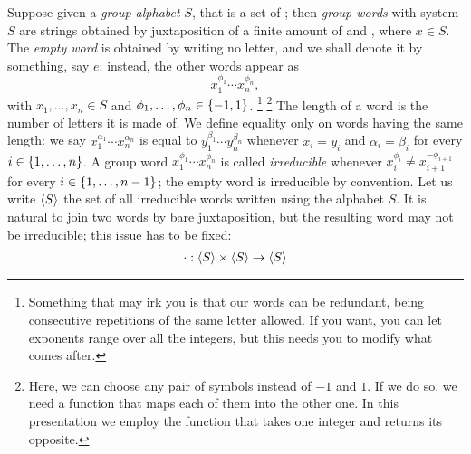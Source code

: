 \begin{example}
Suppose given a {\em group alphabet} \(S\), that is a set of ; then {\em group words} with system \(S\) are strings obtained by juxtaposition of a finite amount of  and , where \(x \in S\). The {\em empty word} is obtained by writing no letter, and we shall denote it by something, say \(e\); instead, the other words appear as
\[x_1^{\phi_1} \cdots{} x_n^{\phi_n},\]
with \(x_1, \dots{}, x_n \in S\) and \(\phi_1, \dots{}, \phi_n \in \left\{-1, 1\right\}\).
\footnote{Something that may irk you is that our words can be redundant, being consecutive repetitions of the same letter allowed. If you want, you can let exponents range over all the integers, but this needs you to modify what comes after.}
\footnote{Here, we can choose any pair of symbols instead of \(-1\) and \(1\). If we do so, we need a function that maps each of them into the other one. In this presentation we employ the function that takes one integer and returns its opposite.}
\newline
The length of a word is the number of letters it is made of. We define equality only on words having the same length: we say \(x_1^{\alpha_1} \cdots{} x_n^{\alpha_n}\) is equal to \(y_1^{\beta_1} \cdots{} y_n^{\beta_n}\) whenever \(x_i = y_i\) and \(\alpha_i = \beta_i\) for every \(i \in \left\{1, \dots{}, n\right\}\).\newline
A group word \(x_1^{\phi_1} \cdots{} x_n^{\phi_n}\) is called {\em irreducible} whenever \(x_i^{\phi_i} \ne x_{i+1}^{-\phi_{i+1}}\) for every \(i \in \left\{1, \dots{}, n-1\right\}\); the empty word is irreducible by convention. Let us write \(\left\langle S\right\rangle\) the set of all irreducible words written using the alphabet \(S\). It is natural to join two words by bare juxtaposition, but the resulting word may not be irreducible; this issue has to be fixed:
\[\begin{aligned}
& \cdot : \angled S \times \angled S \to \angled S \\

\end{aligned}\]
\end{example}
